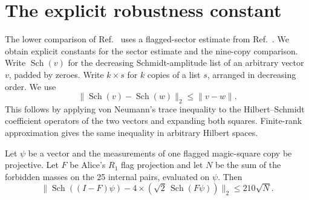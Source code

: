 \section{The explicit robustness constant}\label{sec:explicit-robust}

The lower comparison of Ref.~\cite{TG} uses a flagged-sector estimate from
Ref.~\cite{PP}. We obtain explicit constants for the sector estimate and
the nine-copy comparison. Write $\operatorname{Sch}(v)$ for the decreasing
Schmidt-amplitude list of an arbitrary vector $v$, padded by zeroes. Write
$k\times s$ for $k$ copies of a list $s$, arranged in decreasing order.
We use
\begin{equation}\label{eq:sch-contract-explicit}
 \|\operatorname{Sch}(v)-\operatorname{Sch}(w)\|_2\le\|v-w\|.
\end{equation}
This follows by applying von Neumann's trace inequality to the
Hilbert--Schmidt coefficient operators of the two vectors and expanding
both squares. Finite-rank approximation gives the same inequality in
arbitrary Hilbert spaces.

\begin{lemma}\label{lem:explicit-sector}
Let $\psi$ be a vector and the measurements of one flagged magic-square
copy be projective. Let $F$ be Alice's $R_1$ flag projection and let $N$
be the sum of the forbidden masses on the 25 internal pairs, evaluated
on $\psi$. Then
\begin{equation}\label{eq:explicit-sector}
 \|\operatorname{Sch}((I-F)\psi)
      -4\times(\sqrt2\,\operatorname{Sch}(F\psi))\|_2\le 210\sqrt N .
\end{equation}
\end{lemma}

